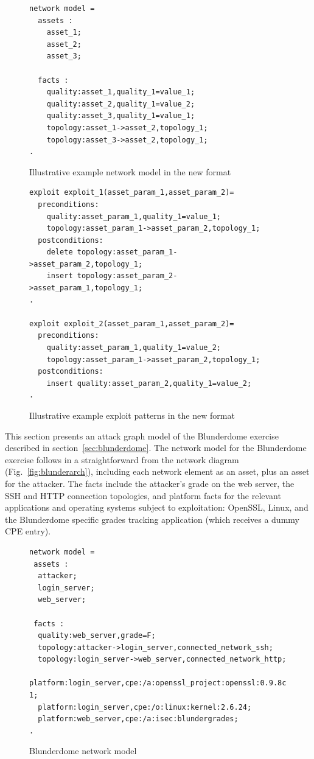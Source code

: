\begin{figure}
\begin{lstlisting}
network model = 
  assets :
    asset_1;
    asset_2;
    asset_3;

  facts :
    quality:asset_1,quality_1=value_1;
    quality:asset_2,quality_1=value_2;
    quality:asset_3,quality_1=value_1;
    topology:asset_1->asset_2,topology_1;
    topology:asset_3->asset_2,topology_1;
.
\end{lstlisting}
\caption{Illustrative example network model in the new format}
\label{fig:ill_updated_nm}
\end{figure}

\begin{figure}
\begin{lstlisting}
exploit exploit_1(asset_param_1,asset_param_2)=
  preconditions:
    quality:asset_param_1,quality_1=value_1;
    topology:asset_param_1->asset_param_2,topology_1;
  postconditions:
    delete topology:asset_param_1->asset_param_2,topology_1;
    insert topology:asset_param_2->asset_param_1,topology_1;
.

exploit exploit_2(asset_param_1,asset_param_2)=
  preconditions:
    quality:asset_param_1,quality_1=value_2;
    topology:asset_param_1->asset_param_2,topology_1;
  postconditions:
    insert quality:asset_param_2,quality_1=value_2;
.
\end{lstlisting}
\caption{Illustrative example exploit patterns in the new format}
\label{fig:ill_updated_xp}
\end{figure}

This section presents an attack graph model of the Blunderdome exercise
described in section~\ref{sec:blunderdome}.
The network model for the Blunderdome exercise follows in a straightforward
from the network diagram (Fig.~\ref{fig:blunderarch}), including each network
element as an asset, plus an asset for the attacker. The facts include the
attacker's grade on the web server, the SSH and HTTP connection topologies,
and platform facts for the relevant applications and operating systems subject
to exploitation: OpenSSL, Linux, and the Blunderdome specific grades tracking
application (which receives a dummy CPE entry).

\begin{figure}
\begin{lstlisting}
network model = 
 assets :
  attacker;
  login_server;
  web_server;
    
 facts :
  quality:web_server,grade=F;
  topology:attacker->login_server,connected_network_ssh;
  topology:login_server->web_server,connected_network_http;
  platform:login_server,cpe:/a:openssl_project:openssl:0.9.8c-1;
  platform:login_server,cpe:/o:linux:kernel:2.6.24;
  platform:web_server,cpe:/a:isec:blundergrades;
.
\end{lstlisting}
\caption{Blunderdome network model}
\label{fig:blunder_nm}
\end{figure}

